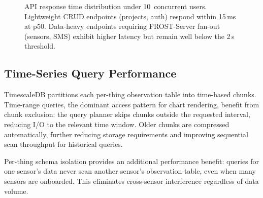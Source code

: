 \begin{figure}[p]
  \centering
  \caption{API response time distribution under 10~concurrent users.
           Lightweight CRUD endpoints (projects, auth) respond within 15\,ms
           at p50. Data-heavy endpoints requiring FROST-Server fan-out (sensors,
           SMS) exhibit higher latency but remain well below the 2\,s threshold.}
  \label{fig:load-test-chart}
\end{figure}

\subsection{Time-Series Query Performance}
\label{sec:test-perf-timescaledb}

TimescaleDB partitions each per-thing observation table into time-based chunks. Time-range
queries, the dominant access pattern for chart rendering, benefit from chunk exclusion:
the query planner skips chunks outside the requested interval, reducing I/O to the relevant
time window. Older chunks are compressed automatically, further reducing storage requirements
and improving sequential scan throughput for historical queries.

Per-thing schema isolation provides an additional performance benefit: queries for one
sensor's data never scan another sensor's observation table, even when many sensors are
onboarded. This eliminates cross-sensor interference regardless of data volume.

